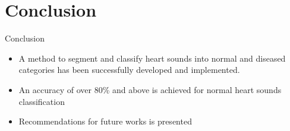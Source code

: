 \documentclass[10pt]{beamer}
\begin{document}
\section{Conclusion}
\begin{frame}{Conclusion}
\begin{itemize}
	\item A method to segment and classify heart sounds into normal and diseased categories has been successfully developed  and  implemented.
	\item An accuracy of over 80\% and above is achieved for normal heart sounds classification
	\item Recommendations for future works is presented
\end{itemize}{}
\end{frame}
\end{document}
